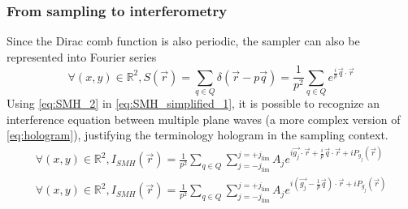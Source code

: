 \documentclass[12pt]{article}
\begin{document}
\subsubsection*{From sampling to interferometry}

Since the Dirac comb function is also periodic, the sampler can also be 
represented into Fourier series
\begin{equation}
\forall (x,y) \in \mathbb{R}^{2}, S(\vec{r})=\sum_{q\in 
Q}\delta(\vec{r}-p\vec{q}) = \frac{1}{p^2}\sum_{q\in 
Q}e^{\frac{i}{p}\vec{q}\cdot\vec{r}}
\label{eq:SMH_2}
\end{equation}
Using \cref{eq:SMH_2} in \cref{eq:SMH_simplified_1}, it is possible to recognize 
an interference equation between multiple plane waves (a more complex version of 
\cref{eq:hologram}), justifying the terminology hologram in the sampling 
context.
\begin{equation}
\begin{gathered}
\forall (x,y) \in \mathbb{R}^{2}, 
I_{\mathit{SMH}}(\vec{r})=\frac{1}{p^2}\sum_{q\in 
Q}\sum_{j=-j_{\text{lim}}}^{j=+j_{\text{lim}}}A_je^{i\vec{g_j}\cdot\vec{r}+\frac{i}{p}\vec{q}\cdot\vec{r}+iP_{g_{j}}(\vec{r})} 
\\
\forall (x,y) \in \mathbb{R}^{2}, 
I_{\mathit{SMH}}(\vec{r})=\frac{1}{p^2}\sum_{q\in 
Q}\sum_{j=-j_{\text{lim}}}^{j=+j_{\text{lim}}}A_je^{i(\vec{g_j}-\frac{1}{p}\vec{q})\cdot\vec{r}+iP_{g_{j}}(\vec{r})}
\end{gathered}
\label{eq:SMH_3}
\end{equation}
\end{document}
